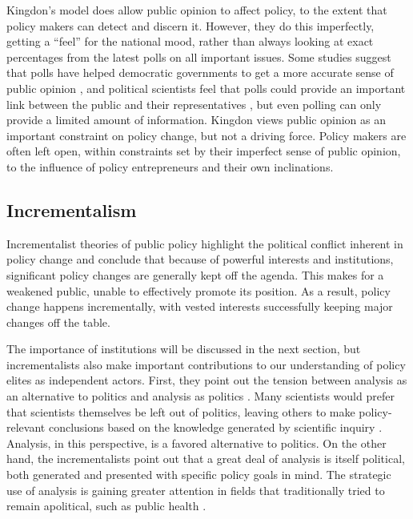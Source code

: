 Kingdon's model does allow public opinion to affect policy, to the extent that policy makers can detect and discern it. However, they do this imperfectly, getting a ``feel'' for the national mood, rather than always looking at exact percentages from the latest polls on all important issues. Some studies suggest that polls have helped democratic governments to get a more accurate sense of public opinion \citep{Jacobs1993}, and political scientists feel that polls could provide an important link between the public and their representatives \citep{Verba1996}, but even polling can only provide a limited amount of information. Kingdon views public opinion as an important constraint on policy change, but not a driving force. Policy makers are often left open, within constraints set by their imperfect sense of public opinion, to the influence of policy entrepreneurs and their own inclinations.

\subsection*{Incrementalism}
Incrementalist theories of public policy \citep[see][]{Lindblom1965} highlight the political conflict inherent in policy change and conclude that because of powerful interests and institutions, significant policy changes are generally kept off the agenda. This makes for a weakened public, unable to effectively promote its position. As a result, policy change happens incrementally, with vested interests successfully keeping major changes off the table.

The importance of institutions will be discussed in the next section, but incrementalists also make important contributions to our understanding of policy elites as independent actors. First, they point out the tension between analysis as an alternative to politics and analysis as politics \citep[][ch. 5]{Lindblom1965}. Many scientists would prefer that scientists themselves be left out of politics, leaving others to make policy-relevant conclusions based on the knowledge generated by scientific inquiry \citep{Oliver2006,Rothman1985}. Analysis, in this perspective, is a favored alternative to politics. On the other hand, the incrementalists point out that a great deal of analysis is itself political, both generated and presented with specific policy goals in mind. The strategic use of analysis is gaining greater attention in fields that traditionally tried to remain apolitical, such as public health \citep{Oliver2006,Bernier2011,Lezine2007,Navarro2008}.

